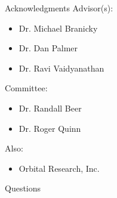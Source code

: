 \begin{slide}{Acknowledgments}
  Advisor(s):
  \begin{itemize}
  \item Dr. Michael Branicky
  \item Dr. Dan Palmer
  \item Dr. Ravi Vaidyanathan
  \end{itemize}
  
  \bigskip

  Committee:
  \begin{itemize}
  \item Dr. Randall Beer
  \item Dr. Roger Quinn
  \end{itemize}
  
  \bigskip

  Also:
  \begin{itemize}
  \item Orbital Research, Inc.
  \end{itemize}
\end{slide}


\begin{slide}{Questions}
\end{slide}


